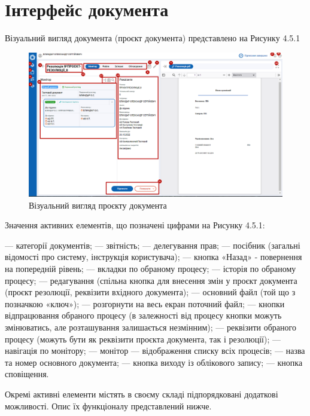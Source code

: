 \section{Інтерфейс документа}

Візуальний вигляд документа (проєкт документа) представлено на Рисунку 4.5.1

\begin{figure}[!htbp]
\centerline{\includegraphics[width=\textwidth]{img/4.5.1.png}}
\caption{Візуальний вигляд проєкту документа}
\end{figure}

Значення активних елементів, що позначені цифрами на Рисунку 4.5.1:

 --- категорії документів;
 --- звітність;
 --- делегування прав;
 --- посібник (загальні відомості про систему, інструкція користувача);
 --- кнопка «Назад» - повернення на попередній рівень;
 --- вкладки по обраному процесу;
 --- історія по обраному процесу;
 --- редагування (спільна кнопка для внесення змін у проєкт документа (проєкт резолюції, реквізити вхідного документа);
 --- основний файл (той що з позначкою «ключ»);
 --- розгорнути на весь екран поточний файл;
 --- кнопки відпрацювання обраного процесу (в залежності від процесу кнопки можуть змінюватись, але розташування залишається незмінним);
 --- реквізити обраного процесу (можуть бути як реквізити проєкта документа, так і резолюції);
 --- навігація по монітору;
 --- монітор --- відображення списку всіх процесів;
 --- назва та номер основного документа;
 --- кнопка виходу із облікового запису;
 --- кнопка сповіщення.

Окремі активні елементи містять в своєму складі підпорядковані додаткові
можливості. Опис їх функціоналу представлений нижче.

